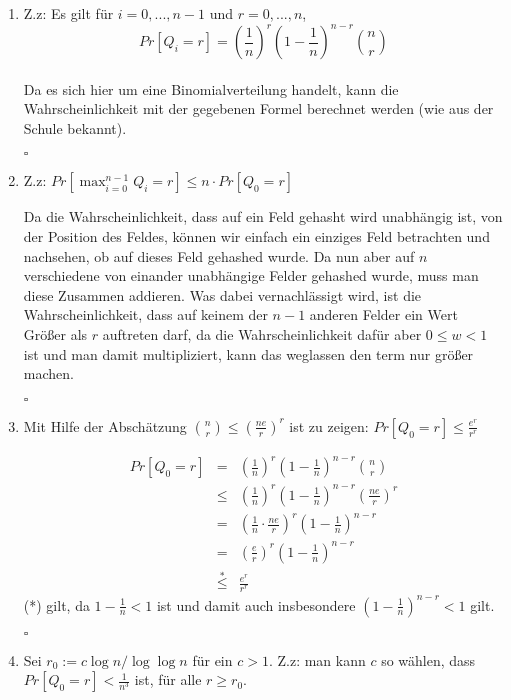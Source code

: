 \documentclass[11pt,a4paper,ngerman]{article}
\begin{document}
\begin{enumerate}[\bfseries a)]

\item Z.z: Es gilt für $i = 0, ..., n - 1$ und $r = 0, ...,n$,
$$ Pr[Q_i = r] = \left( \frac{1}{n} \right)^r \left(1-  \frac{1}{n} \right)^{n-r} \binom{n}{r}$$
\\
Da es sich hier um eine Binomialverteilung handelt, kann die Wahrscheinlichkeit mit der gegebenen Formel berechnet werden (wie aus der Schule bekannt).

\mbox{}\hfill $\square$

\item Z.z: $ Pr[\max_{i=0}^{n-1} Q_i = r] \leq n \cdot Pr[Q_0 = r] $ 

Da die Wahrscheinlichkeit, dass auf ein Feld gehasht wird unabhängig ist, von der Position des Feldes, können wir einfach ein einziges Feld betrachten und nachsehen, ob auf dieses Feld gehashed wurde. Da nun aber auf $n$ verschiedene von einander unabhängige Felder gehashed wurde, muss man diese Zusammen addieren. Was dabei vernachlässigt wird, ist die Wahrscheinlichkeit, dass auf keinem der $n-1$ anderen Felder ein Wert Größer als $r$ auftreten darf, da die Wahrscheinlichkeit dafür aber $0\leq w < 1$ ist und man damit multipliziert, kann das weglassen den term nur größer machen.

\mbox{}\hfill $\square$

\item Mit Hilfe der Abschätzung $\binom{n}{r} \leq \left( \frac{ne}{r} \right)^r$ ist zu zeigen: $ Pr[Q_0 = r] \leq \frac{e^r}{r^r} $

$$ 
\begin{array}{lcl}
Pr[Q_0 = r] & = & \left( \frac{1}{n} \right)^r \left(1-  \frac{1}{n} \right)^{n-r} \binom{n}{r} \\
 & \leq & \left( \frac{1}{n} \right)^r \left(1-  \frac{1}{n} \right)^{n-r} \left( \frac{ne}{r} \right)^r \\
 & = & \left( \frac{1}{n} \cdot \frac{ne}{r} \right)^r \left(1-  \frac{1}{n} \right)^{n-r} \\
 & = & \left( \frac{e}{r} \right)^r \left(1-  \frac{1}{n} \right)^{n-r} \\
 & \stackrel{*}{\leq} & \frac{e^r}{r^r}
\end{array}
$$
(*) gilt, da $1 - \frac{1}{n} < 1$ ist und damit auch insbesondere $\left(1-  \frac{1}{n} \right)^{n-r} < 1$ gilt.

\mbox{}\hfill $\square$

\item Sei $r_0 := c \log n / \log \log n $ für ein $c > 1$. Z.z:
man kann $c$ so wählen, dass $Pr[Q_0 = r] < \frac{1}{n^3}$ ist, für alle $r \geq r_0$.\\


\end{enumerate}
\end{document}
